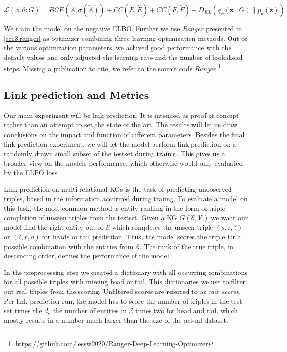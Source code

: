 \begin{equation}
    \mathcal{L}(\phi,\theta:G) = BCE(A,\sigma(\tilde{A})) + CC(E,\tilde{E}) + CC(F,\tilde{F}) - D_{K L}\left(q_{{\phi}}\left(\mathbf{z} \mid G\right) \| p_{{\theta}}(\mathbf{z})\right)
    \label{eg4:normalELBO}
\end{equation}

We train the model on the negative ELBO. Further we use \textit{Ranger} presented in \ref{sec3:ranger} as optimizer combining three learning optimization methods. Out of the various optimization parameters, we achived good performance with the default values and  only adjusted the learning rate and the number of lookahead steps. Missing a publication to cite, we refer to the source code \textit{Ranger} \footnote{\url{https://github.com/lessw2020/Ranger-Deep-Learning-Optimizer}}



\subsection{Link prediction and Metrics}
Our main experiment will be link prediction. It is intended as proof of concept rather than an attempt to set the state of the art. The results will let us draw conclusions on the impact and function of different parameters.
Besides the final link prediction experiment, we will let the model perform link prediction on a randomly drawn small subset of the testset during trainig. This gives us a broader view on the models performance, which otherwise would only evaluated by the ELBO loss.  

Link prediction on multi-relational KGs is the task of predicting unobserved triples, based in the information accurired during traiing. To evaluate a model on this task, the most common method is entity ranking in the form of triple completion of unseen triples from the testset. Given a KG $G(\mathcal{E},\mathcal{V})$ we want our model find the right entity out of $\mathcal{E}$ which completes the unseen triple $(s,r,?)$ or $(?,r,o)$ for heads or tail prediciton. Thus, the model scores the triple for all possible combination with the entities from $\mathcal{E}$. The rank of the true triple, in descending order, defines the performance of the model \cite{ruffinelli_you_2019}.

In the preprocessing step we created a dictionary with all occurring combinations for all possible triples with missing head or tail. This dictionaries we use to filter out real triples from the scoring. Unfiltered scores are referred to as \textit{raw scores}. Per link prediction run, the model has to score the number of triples in the test set times the $d_e$ the number of entities in $\mathcal{E}$ times two for head and tail, which mostly results in a number much larger than the size of the actual dataset.

